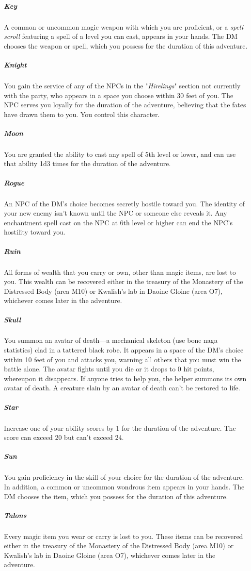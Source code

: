 \documentclass[10pt,a4paper,twoside,bg=print,twocolumn,openany,nodeprecatedcode]{dndbook}
\begin{document}
\subparagraph{Key}
A common or uncommon magic weapon with which you are proficient, or a \textit{spell scroll} featuring a spell of a level you can cast, appears in your hands. The DM chooses the weapon or spell, which you possess for the duration of this adventure.

\subparagraph{Knight}
You gain the service of any of the NPCs in the "\textit{Hirelings}" section not currently with the party, who appears in a space you choose within 30 feet of you. The NPC serves you loyally for the duration of the adventure, believing that the fates have drawn them to you. You control this character.

\subparagraph{Moon}
You are granted the ability to cast any spell of 5th level or lower, and can use that ability 1d3 times for the duration of the adventure.

\subparagraph{Rogue}
An NPC of the DM's choice becomes secretly hostile toward you. The identity of your new enemy isn't known until the NPC or someone else reveals it. Any enchantment spell cast on the NPC at 6th level or higher can end the NPC's hostility toward you.

\subparagraph{Ruin}
All forms of wealth that you carry or own, other than magic items, are lost to you. This wealth can be recovered either in the treasury of the Monastery of the Distressed Body (area M10) or Kwalish's lab in Daoine Gloine (area O7), whichever comes later in the adventure.

\subparagraph{Skull}
You summon an avatar of death—a mechanical skeleton (use bone naga statistics) clad in a tattered black robe. It appears in a space of the DM's choice within 10 feet of you and attacks you, warning all others that you must win the battle alone. The avatar fights until you die or it drops to 0 hit points, whereupon it disappears. If anyone tries to help you, the helper summons its own avatar of death. A creature slain by an avatar of death can't be restored to life.

\subparagraph{Star}
Increase one of your ability scores by 1 for the duration of the adventure. The score can exceed 20 but can't exceed 24.

\subparagraph{Sun}
You gain proficiency in the skill of your choice for the duration of the adventure. In addition, a common or uncommon wondrous item appears in your hands. The DM chooses the item, which you possess for the duration of this adventure.

\subparagraph{Talons}
Every magic item you wear or carry is lost to you. These items can be recovered either in the treasury of the Monastery of the Distressed Body (area M10) or Kwalish's lab in Daoine Gloine (area O7), whichever comes later in the adventure.
\end{document}
